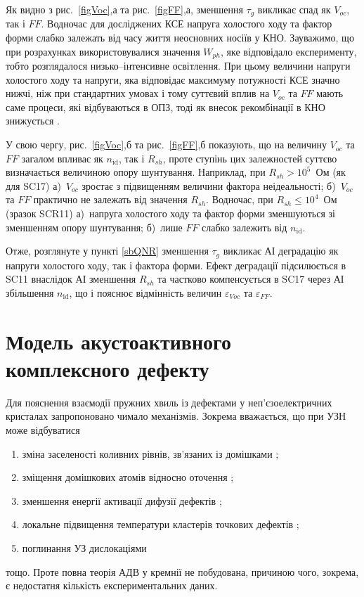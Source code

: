 Як видно з рис.~\ref{figVoc},а та рис.~\ref{figFF},а, зменшення $\tau_g$ викликає спад як $V_{oc}$, так і $F\!F$.
Водночас для досліджених КСЕ напруга холостого ходу та фактор форми слабко залежать від
часу життя неосновних носіїв у КНО.
Зауважимо, що при розрахунках використовувалися значення $W_{ph}$, яке відповідало експерименту,
тобто розглядалося низько--інтенсивне освітлення.
При цьому величини напруги холостого ходу та напруги, яка відповідає максимуму потужності КСЕ значно нижчі,
ніж при стандартних умовах і тому суттєвий вплив на $V_{oc}$ та $F\!F$ мають саме процеси, які відбуваються
в ОПЗ, тоді як внесок рекомбінації в КНО знижується \cite{Breitenstein2013}.

У свою чергу, рис.~\ref{figVoc},б та рис.~\ref{figFF},б показують,
що на величину $V_{oc}$ та $F\!F$ загалом впливає як $n_\mathrm{id}$, так і $R_{sh}$,
проте ступінь цих залежностей суттєво визначається величиною  опору шунтування.
Наприклад, при $R_{sh}>10^5$~Ом (як для SC17)
а)~$V_{oc}$ зростає з підвищенням величини фактора неідеальності;
б)~$V_{oc}$ та $FF$ практично не залежать від значення $R_{sh}$.
Водночас, при $R_{sh}\leq10^4$~Ом (зразок SCR11)
а)~напруга холостого ходу та фактор форми зменшуються зі зменшенням  опору шунтування;
б)~лише $F\!F$ слабко залежить від $n_\mathrm{id}$.

Отже, розглянуте у пункті \ref{sbQNR} зменшення $\tau_g$ викликає АІ деградацію як напруги
холостого ходу, так і фактора форми.
Ефект деградації підсилюється в SC11 внаслідок АІ зменшення $R_{sh}$ та частково компенсується в SC17
через АІ збільшення $n_\mathrm{id}$, що і пояснює відмінність величин $\varepsilon_{Voc}$ та $\varepsilon_{FF}$.



\section{Модель акустоактивного комплексного дефекту\label{sbAEDefect}}

Для пояснення взаємодії пружних хвиль із дефектами у неп'єзоелектричних кристалах
запропоновано чимало механізмів.
Зокрема вважається, що при УЗН може відбуватися
\begin{enumerate}[label=\asbuk*),leftmargin=0em,itemindent=1.5em]
\item зміна заселеності коливних рівнів, зв'язаних із домішками \cite{Pavlovich};
\item зміщення домішкових атомів відносно оточення \cite{Korotchenkov1995,MirzadeR,MirzadeJAP2011,PELESHCHAK:UPJ2016};
\item зменшення енергії активації дифузії дефектів \cite{Krevchik};
\item локальне підвищення температури кластерів точкових дефектів  \cite{MirzadeJAP2005};
\item поглинання УЗ дислокаціями \cite{Davletova2008,OstrovKor92}
\end{enumerate}
тощо.
Проте повна теорія АДВ у кремнії не побудована, причиною чого, зокрема, є недостатня
кількість експериментальних даних.

